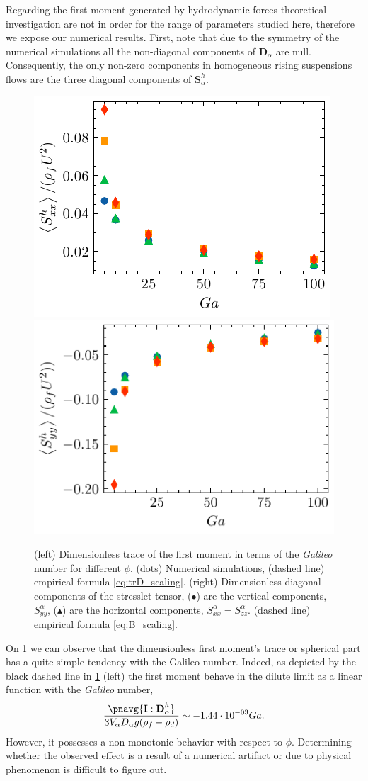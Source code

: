 Regarding the first moment generated by hydrodynamic forces theoretical investigation are not in order for the range of parameters studied here, therefore we expose our numerical results. 
First, note that due to the symmetry of the numerical simulations all the non-diagonal components of $\textbf{D}_\alpha$ are null.
Consequently, the only non-zero components in homogeneous rising suspensions flows are the three diagonal components of $\textbf{S}_\alpha^h$.
\begin{figure}[h!]
    \centering
    \includegraphics[height=0.3\textwidth]{image/HOMOGENEOUS/fPA/Sxx.pdf}
    \includegraphics[height=0.3\textwidth]{image/HOMOGENEOUS/fPA/Syy.pdf}
    \caption{(left) Dimensionless trace of the first moment in terms of the \textit{Galileo} number for different $\phi$. (dots) Numerical simulations, (dashed line) empirical formula \ref{eq:trD_scaling}.
    (right) Dimensionless diagonal components of the stresslet tensor, ($\bullet$) are the vertical components, $S^\alpha_{yy}$, ($\blacktriangle$) are the horizontal components, $S^\alpha_{xx} = S^\alpha_{zz}$. (dashed line) empirical formula \ref{eq:B_scaling}.}
    \label{fig:trD_Sx_Sy}
\end{figure}
On \ref{fig:trD_Sx_Sy} we can observe that the dimensionless first moment's trace or spherical part has a quite simple tendency with the Galileo number.
Indeed, as depicted by the black dashed line in \ref{fig:trD_Sx_Sy} (left) the first moment behave in the dilute limit as a linear function with the \textit{Galileo} number, 
\begin{equation}
    \frac
    {\pnavg{\textbf{I}:\textbf{D}_\alpha^h}}
    {3V_\alpha D_\alpha g (\rho_f - \rho_d)}
    \sim  -1.44\cdot 10^{-03} Ga.
    \label{eq:trD_scaling}
\end{equation}
However, it possesses a non-monotonic behavior with respect to $\phi$. 
Determining whether the observed effect is a result of a numerical artifact or due to physical phenomenon is difficult to figure out.

